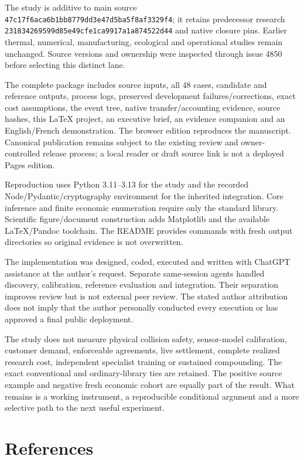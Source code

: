 \documentclass[11pt,letterpaper]{article}
\begin{document}
The study is additive to main source
\texttt{47c17f6aca6b1bb8779dd3e47d5ba5f8af3329f4}; it retains
predecessor research \texttt{231834269599d85e49cfe1ca9917a1a874522d44}
and native closure pins. Earlier thermal, numerical, manufacturing,
ecological and operational studies remain unchanged. Source versions and
ownership were inspected through issue 4850 before selecting this
distinct lane.

The complete package includes source inputs, all 48 cases, candidate and
reference outputs, process logs, preserved development
failures/corrections, exact cost assumptions, the event tree, native
transfer/accounting evidence, source hashes, this LaTeX project, an
executive brief, an evidence companion and an English/French
demonstration. The browser edition reproduces the manuscript. Canonical
publication remains subject to the existing review and owner-controlled
release process; a local reader or draft source link is not a deployed
Pages edition.

Reproduction uses Python 3.11--3.13 for the study and the recorded
Node/Pydantic/cryptography environment for the inherited integration.
Core inference and finite economic enumeration require only the standard
library. Scientific figure/document construction adds Matplotlib and the
available LaTeX/Pandoc toolchain. The README provides commands with
fresh output directories so original evidence is not overwritten.

The implementation was designed, coded, executed and written with
ChatGPT assistance at the author's request. Separate same-session agents
handled discovery, calibration, reference evaluation and integration.
Their separation improves review but is not external peer review. The
stated author attribution does not imply that the author personally
conducted every execution or has approved a final public deployment.

The study does not measure physical collision safety, sensor-model
calibration, customer demand, enforceable agreements, live settlement,
complete realized research cost, independent specialist training or
sustained compounding. The exact conventional and ordinary-library ties
are retained. The positive source example and negative fresh economic
cohort are equally part of the result. What remains is a working
instrument, a reproducible conditional argument and a more selective
path to the next useful experiment.

\hypertarget{bibliography}{%
\section*{References}\label{bibliography}}
\end{document}
